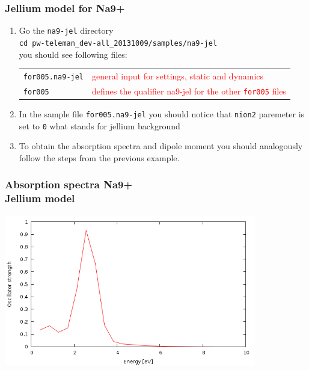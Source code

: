 \documentclass[10pt]{beamer}
\begin{document}
\begin{frame}
\frametitle{Jellium model for Na9+}
\begin{enumerate}
\item Go the {\tt na9-jel} directory\\
\vspace*{0.2cm}
{\tt cd pw-teleman\_dev-all\_20131009/samples/na9-jel}\\
\vspace*{0.2cm}
you should see following files:\\
\vspace*{0.2cm}
\begin{tabular}{ll}
{\tt for005.na9-jel} &{\scriptsize{\textcolor{red}{general input for settings, static and dynamics}}}\\
{\tt for005}  &{\scriptsize{\textcolor{red}{defines the qualifier na9-jel for the other {\tt for005} files}}}\\
\end{tabular}
\vspace*{0.4cm}


\item In the sample file {\tt for005.na9-jel} you should notice that {\tt nion2} paremeter is set to {\tt 0} what stands for jellium background

\item To obtain the absorption spectra and dipole moment you should analogously follow the steps from the previous example. 
\end{enumerate}
\end{frame}
\begin{frame}
\frametitle{Absorption spectra Na9+\\
Jellium model}

\centering
\includegraphics[width=11cm]{fig/spectrana9j} 

\end{frame}
\end{document}
